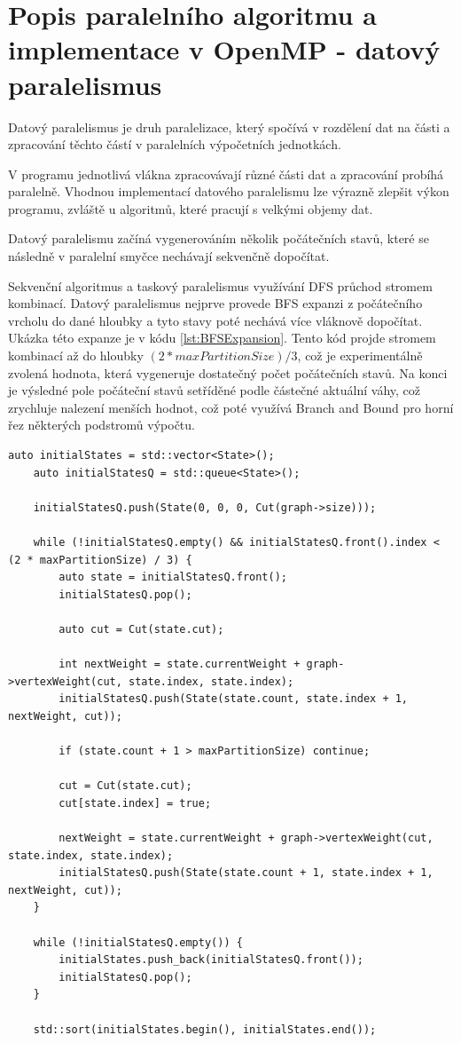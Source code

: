\documentclass[epsf,epic,eepic,eepicemu]{article}\oddsidemargin=-5mm
\begin{document}
\section{Popis paralelního algoritmu a implementace v OpenMP - datový paralelismus}

Datový paralelismus je druh paralelizace, který spočívá v rozdělení dat na části a zpracování těchto částí v paralelních výpočetních jednotkách.

V programu jednotlivá vlákna zpracovávají různé části dat a zpracování probíhá paralelně. Vhodnou implementací datového paralelismu lze výrazně zlepšit výkon programu, zvláště u algoritmů, které pracují s velkými objemy dat.

Datový paralelismu začíná vygenerováním několik počátečních stavů, které se následně v paralelní smyčce nechávají sekvenčně dopočítat.

Sekvenční algoritmus a taskový paralelismus využívání DFS průchod stromem kombinací. Datový paralelismus nejprve provede BFS expanzi z počátečního vrcholu do dané hloubky a tyto stavy poté nechává více vláknově dopočítat. Ukázka této expanze je v kódu \ref{lst:BFSExpansion}. Tento kód projde stromem kombinací až do hloubky $(2 * maxPartitionSize) / 3$, což je experimentálně zvolená hodnota, která vygeneruje dostatečný počet počátečních stavů. Na konci je výsledné pole počáteční stavů setříděné podle částečné aktuální váhy, což zrychluje nalezení menších hodnot, což poté využívá Branch and Bound pro horní řez některých podstromů výpočtu.

\begin{lstlisting}[float,label=lst:BFSExpansion, caption={BFS expanze před zahájením datového paralelismu}]
auto initialStates = std::vector<State>();
    auto initialStatesQ = std::queue<State>();

    initialStatesQ.push(State(0, 0, 0, Cut(graph->size)));

    while (!initialStatesQ.empty() && initialStatesQ.front().index < (2 * maxPartitionSize) / 3) {
        auto state = initialStatesQ.front();
        initialStatesQ.pop();

        auto cut = Cut(state.cut);

        int nextWeight = state.currentWeight + graph->vertexWeight(cut, state.index, state.index);
        initialStatesQ.push(State(state.count, state.index + 1, nextWeight, cut));

        if (state.count + 1 > maxPartitionSize) continue;

        cut = Cut(state.cut);
        cut[state.index] = true;

        nextWeight = state.currentWeight + graph->vertexWeight(cut, state.index, state.index);
        initialStatesQ.push(State(state.count + 1, state.index + 1, nextWeight, cut));
    }

    while (!initialStatesQ.empty()) {
        initialStates.push_back(initialStatesQ.front());
        initialStatesQ.pop();
    }

    std::sort(initialStates.begin(), initialStates.end());
\end{lstlisting}
\end{document}
